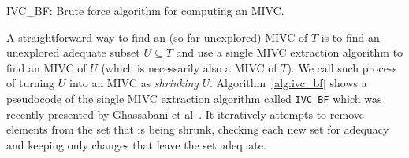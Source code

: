 %
%
%
%
%

\begin{algorithm}[!t]

\caption{IVC\_BF: Brute force algorithm for computing an MIVC. }
\end{algorithm}


A straightforward way to find an (so far unexplored) MIVC of $T$ is to find an unexplored adequate subset $U \subseteq T$  and use a single MIVC extraction algorithm to find an MIVC of $U$ (which is necessarily also  a MIVC of $T$). We call such process of turning $U$ into an MIVC as \emph{shrinking} $U$. Algorithm~\ref{alg:ivc_bf} shows a pseudocode of the single MIVC extraction algorithm called \texttt{IVC\_BF} which was recently presented by Ghassabani et al~\cite{single-ivc}.   
It iteratively attempts to remove elements from the set that is being
shrunk, checking each new set for adequacy and keeping only changes that
leave the set adequate.

